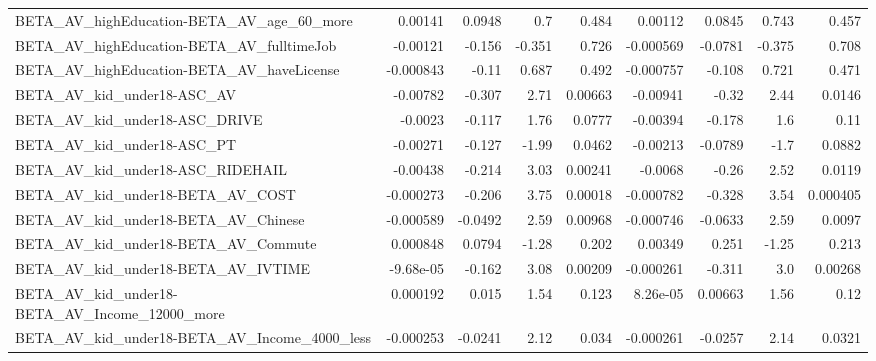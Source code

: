 \begin{tabular}{lrrrrrrrr}
BETA\_AV\_highEducation-BETA\_AV\_age\_60\_more          &     0.00141 &       0.0948 &      0.7 &    0.484 &    0.00112 &      0.0845 &        0.743 &         0.457 \\
BETA\_AV\_highEducation-BETA\_AV\_fulltimeJob          &    -0.00121 &       -0.156 &   -0.351 &    0.726 &  -0.000569 &     -0.0781 &       -0.375 &         0.708 \\
BETA\_AV\_highEducation-BETA\_AV\_haveLicense          &   -0.000843 &        -0.11 &    0.687 &    0.492 &  -0.000757 &      -0.108 &        0.721 &         0.471 \\
BETA\_AV\_kid\_under18-ASC\_AV                         &    -0.00782 &       -0.307 &     2.71 &  0.00663 &   -0.00941 &       -0.32 &         2.44 &        0.0146 \\
BETA\_AV\_kid\_under18-ASC\_DRIVE                      &     -0.0023 &       -0.117 &     1.76 &   0.0777 &   -0.00394 &      -0.178 &          1.6 &          0.11 \\
BETA\_AV\_kid\_under18-ASC\_PT                         &    -0.00271 &       -0.127 &    -1.99 &   0.0462 &   -0.00213 &     -0.0789 &         -1.7 &        0.0882 \\
BETA\_AV\_kid\_under18-ASC\_RIDEHAIL                   &    -0.00438 &       -0.214 &     3.03 &  0.00241 &    -0.0068 &       -0.26 &         2.52 &        0.0119 \\
BETA\_AV\_kid\_under18-BETA\_AV\_COST                   &   -0.000273 &       -0.206 &     3.75 &  0.00018 &  -0.000782 &      -0.328 &         3.54 &      0.000405 \\
BETA\_AV\_kid\_under18-BETA\_AV\_Chinese                &   -0.000589 &      -0.0492 &     2.59 &  0.00968 &  -0.000746 &     -0.0633 &         2.59 &        0.0097 \\
BETA\_AV\_kid\_under18-BETA\_AV\_Commute                &    0.000848 &       0.0794 &    -1.28 &    0.202 &    0.00349 &       0.251 &        -1.25 &         0.213 \\
BETA\_AV\_kid\_under18-BETA\_AV\_IVTIME                 &   -9.68e-05 &       -0.162 &     3.08 &  0.00209 &  -0.000261 &      -0.311 &          3.0 &       0.00268 \\
BETA\_AV\_kid\_under18-BETA\_AV\_Income\_12000\_more      &    0.000192 &        0.015 &     1.54 &    0.123 &   8.26e-05 &     0.00663 &         1.56 &          0.12 \\
BETA\_AV\_kid\_under18-BETA\_AV\_Income\_4000\_less       &   -0.000253 &      -0.0241 &     2.12 &    0.034 &  -0.000261 &     -0.0257 &         2.14 &        0.0321 \\

\end{tabular}
